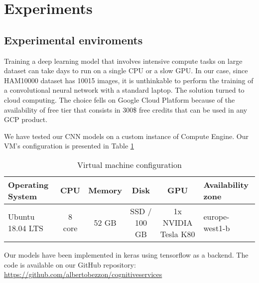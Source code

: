 \section{Experiments}

	\subsection{Experimental enviroments}
	
		Training a deep learning model that involves intensive compute tasks on large dataset can take days to run on a single CPU or a slow GPU. In our case, since HAM10000 dataset has 10015 images, it is unthinkable to perform the training of a convolutional neural network with a standard laptop. The solution turned to cloud computing. The choice fells on Google Cloud Platform because of the availability of free tier that consists in 300\$ free credits that can be used in any GCP product. 
		
		\smallskip
		
		We have tested our CNN models on a custom instance of Compute Engine. Our VM’s configuration is presented in Table \ref{tab:hw-config}
		
		\begin{table}[H]
			\small
			\begin{tabular}{ |>{\centering\arraybackslash}p{2.5cm}|c|c|c|c|>{\centering\arraybackslash}p{2.5cm}| }
				\hline
				\textbf{Operating System} & \textbf{CPU} & \textbf{Memory} & \textbf{Disk} & \textbf{GPU} & \textbf{Availability zone} \\ \hline
				
				Ubuntu 18.04 LTS & 8 core & 52 GB & SSD / 100 GB & 1x NVIDIA Tesla K80 &  europe-west1-b\\ \hline
				
			\end{tabular}
			\caption{Virtual machine configuration}
			\label{tab:hw-config}
		\end{table}
	
		Our models have been implemented in keras using tensorflow as a backend. The code is available on our GitHub repository: \url{https://github.com/albertobezzon/cognitiveservices}
		
		